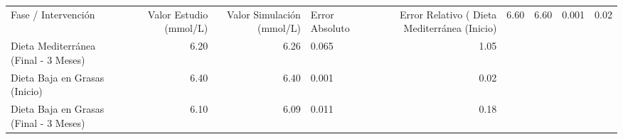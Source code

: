 \begin{tabular}{lrrlr}
\toprule
Fase / Intervención & Valor Estudio (mmol/L) & Valor Simulación (mmol/L) & Error Absoluto & Error Relativo (%
\midrule
Dieta Mediterránea (Inicio) & 6.60 & 6.60 & 0.001 & 0.02 \\
Dieta Mediterránea (Final - 3 Meses) & 6.20 & 6.26 & 0.065 & 1.05 \\
Dieta Baja en Grasas (Inicio) & 6.40 & 6.40 & 0.001 & 0.02 \\
Dieta Baja en Grasas (Final - 3 Meses) & 6.10 & 6.09 & 0.011 & 0.18 \\
\bottomrule
\end{tabular}
